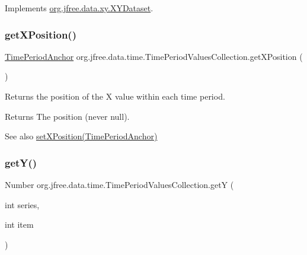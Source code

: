 Implements \mbox{\hyperlink{interfaceorg_1_1jfree_1_1data_1_1xy_1_1_x_y_dataset_a85c75ba5b69b551e96afd29d1732ba22}{org.\+jfree.\+data.\+xy.\+X\+Y\+Dataset}}.

\mbox{\label{classorg_1_1jfree_1_1data_1_1time_1_1_time_period_values_collection_ae373cb525647af8dade90e59920acb78}} 
\subsubsection{\texorpdfstring{get\+X\+Position()}{getXPosition()}}
{\footnotesize\ttfamily \mbox{\hyperlink{classorg_1_1jfree_1_1data_1_1time_1_1_time_period_anchor}{Time\+Period\+Anchor}} org.\+jfree.\+data.\+time.\+Time\+Period\+Values\+Collection.\+get\+X\+Position (\begin{DoxyParamCaption}{ }\end{DoxyParamCaption})}

Returns the position of the X value within each time period.

\begin{DoxyReturn}{Returns}
The position (never {\ttfamily null}).
\end{DoxyReturn}
\begin{DoxySeeAlso}{See also}
\mbox{\hyperlink{classorg_1_1jfree_1_1data_1_1time_1_1_time_period_values_collection_aa959881c9c70b7a2da63870fd8ebdfe4}{set\+X\+Position(\+Time\+Period\+Anchor)}} 
\end{DoxySeeAlso}
\mbox{\label{classorg_1_1jfree_1_1data_1_1time_1_1_time_period_values_collection_a505d89600471d16e572dffeaa4d349ec}} 
\subsubsection{\texorpdfstring{get\+Y()}{getY()}}
{\footnotesize\ttfamily Number org.\+jfree.\+data.\+time.\+Time\+Period\+Values\+Collection.\+getY (\begin{DoxyParamCaption}\item[{int}]{series,  }\item[{int}]{item }\end{DoxyParamCaption})}

